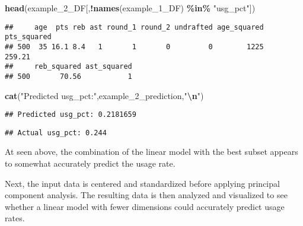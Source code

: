 \documentclass[
]{article}
\newenvironment{Shaded}{\begin{snugshade}}{\end{snugshade}}
\newcommand{\FunctionTok}[1]{\textcolor[rgb]{0.13,0.29,0.53}{\textbf{#1}}}
\newcommand{\NormalTok}[1]{#1}
\newcommand{\SpecialCharTok}[1]{\textcolor[rgb]{0.81,0.36,0.00}{\textbf{#1}}}
\newcommand{\StringTok}[1]{\textcolor[rgb]{0.31,0.60,0.02}{#1}}
\begin{document}
\begin{Shaded}
\begin{Highlighting}[]
\FunctionTok{head}\NormalTok{(example\_2\_DF[,}\SpecialCharTok{!}\FunctionTok{names}\NormalTok{(example\_1\_DF) }\SpecialCharTok{\%in\%} \StringTok{"usg\_pct"}\NormalTok{])}
\end{Highlighting}
\end{Shaded}

\begin{verbatim}
##     age  pts reb ast round_1 round_2 undrafted age_squared pts_squared
## 500  35 16.1 8.4   1       1       0         0        1225      259.21
##     reb_squared ast_squared
## 500       70.56           1
\end{verbatim}

\begin{Shaded}
\begin{Highlighting}[]
\FunctionTok{cat}\NormalTok{(}\StringTok{"Predicted usg\_pct:"}\NormalTok{,example\_2\_prediction,}\StringTok{"}\SpecialCharTok{\textbackslash{}n}\StringTok{"}\NormalTok{)}
\end{Highlighting}
\end{Shaded}

\begin{verbatim}
## Predicted usg_pct: 0.2181659
\end{verbatim}

\begin{Shaded}
\end{Shaded}

\begin{verbatim}
## Actual usg_pct: 0.244
\end{verbatim}

At seen above, the combination of the linear model with the best subset
appears to somewhat accurately predict the usage rate.

Next, the input data is centered and standardized before applying
principal component analysis. The resulting data is then analyzed and
visualized to see whether a linear model with fewer dimensions could
accurately predict usage rates.
\end{document}
